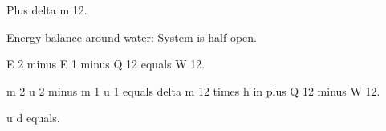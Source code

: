 Plus delta m 12.  

Energy balance around water:  
System is half open.  

E 2 minus E 1 minus Q 12 equals W 12.  

m 2 u 2 minus m 1 u 1 equals delta m 12 times h in plus Q 12 minus W 12.  

u d equals.